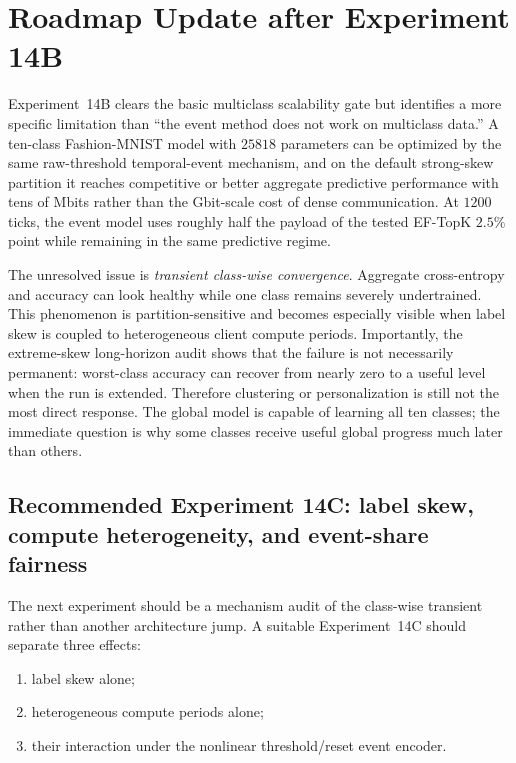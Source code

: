 \section{Roadmap Update after Experiment 14B}
\label{sec:roadmap-post-14b}

Experiment~14B clears the basic multiclass scalability gate but identifies a more specific limitation than ``the event method does not work on multiclass data.'' A ten-class Fashion-MNIST model with $25818$ parameters can be optimized by the same raw-threshold temporal-event mechanism, and on the default strong-skew partition it reaches competitive or better aggregate predictive performance with tens of Mbits rather than the Gbit-scale cost of dense communication. At $1200$ ticks, the event model uses roughly half the payload of the tested EF-TopK $2.5\%$ point while remaining in the same predictive regime.

The unresolved issue is \emph{transient class-wise convergence}. Aggregate cross-entropy and accuracy can look healthy while one class remains severely undertrained. This phenomenon is partition-sensitive and becomes especially visible when label skew is coupled to heterogeneous client compute periods. Importantly, the extreme-skew long-horizon audit shows that the failure is not necessarily permanent: worst-class accuracy can recover from nearly zero to a useful level when the run is extended. Therefore clustering or personalization is still not the most direct response. The global model is capable of learning all ten classes; the immediate question is why some classes receive useful global progress much later than others.

\subsection{Recommended Experiment 14C: label skew, compute heterogeneity, and event-share fairness}

The next experiment should be a mechanism audit of the class-wise transient rather than another architecture jump. A suitable Experiment~14C should separate three effects:
\begin{enumerate}
    \item label skew alone;
    \item heterogeneous compute periods alone;
    \item their interaction under the nonlinear threshold/reset event encoder.
\end{enumerate}

